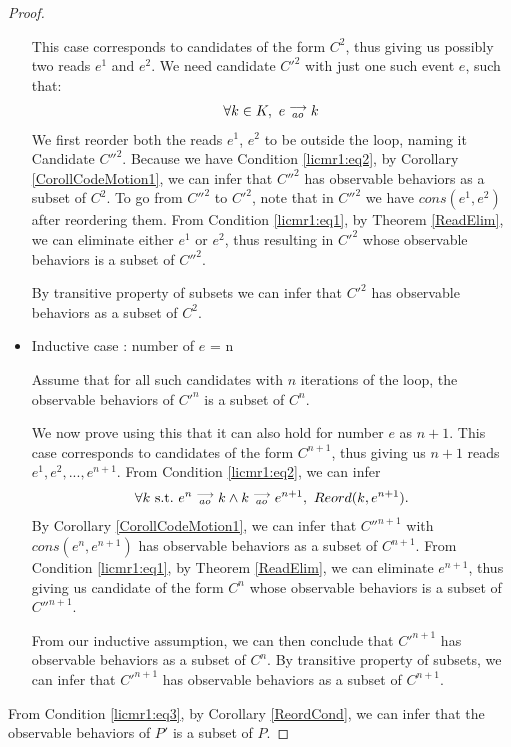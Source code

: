 \begin{proof}
\begin{itemize}
        This case corresponds to candidates of the form $C^2$, thus giving us possibly two reads $e^1$ and $e^2$.
        We need candidate $C'^2$ with just one such event $e$, such that:
        \begin{align*}
            \forall k \in K, \ e\stackrel{\longrightarrow}{_{ao}}k
        \end{align*}
        We first reorder both the reads $e^1$, $e^2$ to be outside the loop, naming it Candidate $C''^2$.
        Because we have Condition \ref{licmr1:eq2}, by Corollary \ref{CorollCodeMotion1}, we can infer that $C''^2$ has observable behaviors as a subset of $C^2$.
        To go from $C''^2$ to $C'^2$, note that in $C''^2$ we have $cons(e^1, e^2)$ after reordering them. 
        From Condition \ref{licmr1:eq1}, by Theorem \ref{ReadElim}, we can eliminate either $e^1$ or $e^2$, thus resulting in $C'^2$ whose observable behaviors is a subset of $C''^2$.
        
        By transitive property of subsets we can infer that $C'^2$ has observable behaviors as a subset of $C^2$.
        
        \item Inductive case : number of $e$ = n

        Assume that for all such candidates with $n$ iterations of the loop, the observable behaviors of $C'^n$ is a subset of $C^n$.

        We now prove using this that it can also hold for number $e$ as $n + 1$. 
        This case corresponds to candidates of the form $C^{n+1}$, thus giving us $n+1$ reads $e^1, e^2,...,e^{n+1}$.
        From Condition \ref{licmr1:eq2}, we can infer 
        \begin{align*}
            \forall k \ \text{s.t.} \ e^n\stackrel{\longrightarrow}{_{ao}}k \wedge k\stackrel{\longrightarrow}{_{ao}}e^{n+1}, \ Reord(k,e^{n+1}).
        \end{align*}
        By Corollary \ref{CorollCodeMotion1}, we can infer that $C''^{n+1}$ with $cons(e^n, e^{n+1})$ has observable behaviors as a subset of $C^{n+1}$. 
        From Condition \ref{licmr1:eq1}, by Theorem \ref{ReadElim}, we can eliminate $e^{n+1}$, thus giving us candidate of the form $C^n$ whose observable behaviors is a subset of $C''^{n+1}$.

        From our inductive assumption, we can then conclude that $C'^{n+1}$ has observable behaviors as a subset of $C^n$. 
        By transitive property of subsets, we can infer that $C'^{n+1}$ has observable behaviors as a subset of $C^{n+1}$.


    \end{itemize}

    From Condition \ref{licmr1:eq3}, by Corollary \ref{ReordCond}, we can infer that the observable behaviors of $P'$ is a subset of $P$.
    
\end{proof}

